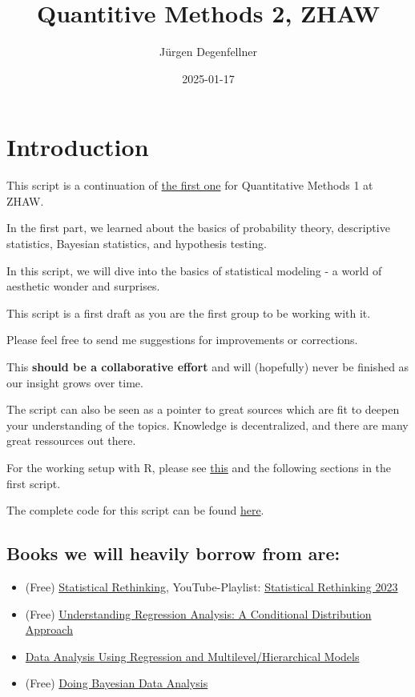 \documentclass[
]{book}
\title{Quantitive Methods 2, ZHAW}
\author{Jürgen Degenfellner}
\date{2025-01-17}
\providecommand{\tightlist}{%
  \setlength{\itemsep}{0pt}\setlength{\parskip}{0pt}}
\begin{document}
\maketitle

{
\setcounter{tocdepth}{1}
\tableofcontents
}
\chapter{Introduction}\label{intro0}

This script is a continuation of
\href{https://jdegenfellner.github.io/Script_QM1_ZHAW/}{the first one} for Quantitative Methods 1
at ZHAW.

In the first part, we learned about the basics of probability theory,
descriptive statistics, Bayesian statistics, and hypothesis testing.

In this script, we will dive into the basics of statistical modeling -
a world of aesthetic wonder and surprises.

This script is a first draft as you are the first group to be working with it.

Please feel free to send me suggestions for improvements or corrections.

This \textbf{should be a collaborative effort} and will (hopefully)
never be finished as our insight grows over time.

The script can also be seen as a pointer to great sources which are
fit to deepen your understanding of the topics. Knowledge is decentralized,
and there are many great ressources out there.

For the working setup with R, please
see \href{https://jdegenfellner.github.io/Script_QM1_ZHAW/index.html\#section}{this}
and the following sections in the first script.

The complete code for this script can be found
\href{https://github.com/jdegenfellner/Script_QM2_ZHAW}{here}.

\section{Books we will heavily borrow from are:}\label{books-we-will-heavily-borrow-from-are}

\begin{itemize}
\tightlist
\item
  (Free) \href{https://civil.colorado.edu/~balajir/CVEN6833/bayes-resources/RM-StatRethink-Bayes.pdf}{Statistical Rethinking}, YouTube-Playlist: \href{https://youtu.be/FdnMWdICdRs?si=q2py5QVY_L299hEa}{Statistical Rethinking 2023}
\item
  (Free) \href{https://vdoc.pub/documents/understanding-regression-analysis-a-conditional-distribution-approach-84oqjr8sqva0}{Understanding Regression Analysis: A Conditional Distribution Approach}
\item
  \href{http://www.stat.columbia.edu/~gelman/arm/}{Data Analysis Using Regression and Multilevel/Hierarchical Models}
\item
  (Free) \href{https://nyu-cdsc.github.io/learningr/assets/kruschke_bayesian_in_R.pdf}{Doing Bayesian Data Analysis}
\end{itemize}
\end{document}
